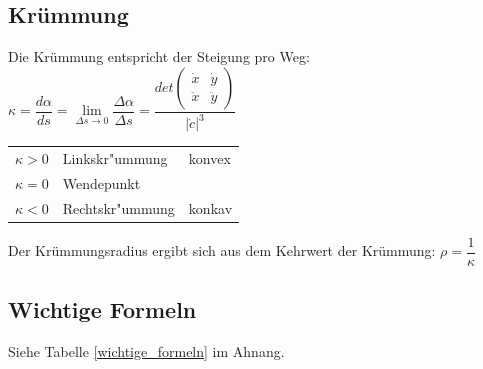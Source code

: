 \subsection{Krümmung}
Die Krümmung entspricht der Steigung pro Weg: $\kappa=\dfrac{d\alpha}{ds} = \lim\limits_{\Delta s \rightarrow 0} \dfrac{\Delta \alpha}{\Delta s} = 
\dfrac{det \begin{pmatrix}
	\dot{x} & \dot{y}\\
	\ddot{x} & \ddot{y}
	\end{pmatrix}}{|\dot{c}|^3} $\\

\begin{tabular}{lll}
  $\kappa > 0$ & Linkskr"ummung & konvex\\
  $\kappa = 0$ & Wendepunkt & \\
  $\kappa < 0$ & Rechtskr"ummung & konkav\\
\end{tabular}
\newline
Der Krümmungsradius ergibt sich aus dem Kehrwert der Krümmung: $\rho = \dfrac{1}{\kappa}$

\subsection{Wichtige Formeln}
Siehe Tabelle \ref{wichtige_formeln} im Ahnang.
\newline

